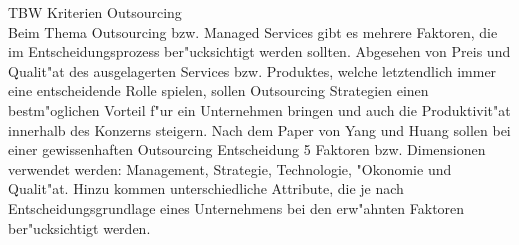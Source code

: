 TBW Kriterien Outsourcing\\
Beim Thema Outsourcing bzw. Managed Services gibt es mehrere Faktoren, die im Entscheidungsprozess ber"ucksichtigt werden sollten. Abgesehen von Preis und Qualit"at des ausgelagerten Services bzw. Produktes, welche letztendlich immer eine entscheidende Rolle spielen, sollen Outsourcing Strategien einen bestm"oglichen Vorteil f"ur ein Unternehmen bringen und auch die Produktivit"at innerhalb des Konzerns steigern. Nach dem Paper von Yang und Huang \cite{Yang2000225} sollen bei einer gewissenhaften Outsourcing Entscheidung 5 Faktoren bzw. Dimensionen verwendet werden: Management, Strategie, Technologie, "Okonomie und Qualit"at. Hinzu kommen unterschiedliche Attribute, die je nach Entscheidungsgrundlage eines Unternehmens bei den erw"ahnten Faktoren ber"ucksichtigt werden.

